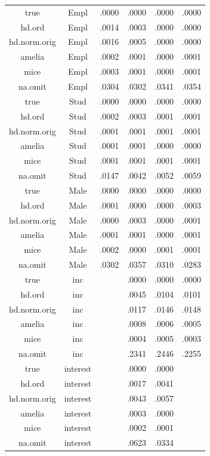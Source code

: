 \documentclass[12pt,econ]{sources/authesis}
\begin{document}
\begin{longtable}{@{\extracolsep{5pt}} cccccc}
true & Empl & .0000 & .0000 & .0000 & .0000 \\ 
hd.ord & Empl & .0014 & .0003 & .0000 & .0000 \\ 
hd.norm.orig & Empl & .0016 & .0005 & .0000 & .0000 \\ 
amelia & Empl & .0002 & .0001 & .0000 & .0001 \\ 
mice & Empl & .0003 & .0001 & .0000 & .0001 \\ 
na.omit & Empl & .0304 & .0302 & .0341 & .0354 \\ 
true & Stud & .0000 & .0000 & .0000 & .0000 \\ 
hd.ord & Stud & .0002 & .0003 & .0001 & .0001 \\ 
hd.norm.orig & Stud & .0001 & .0001 & .0001 & .0001 \\ 
amelia & Stud & .0001 & .0001 & .0000 & .0000 \\ 
mice & Stud & .0001 & .0001 & .0001 & .0001 \\ 
na.omit & Stud & .0147 & .0042 & .0052 & .0059 \\ 
true & Male & .0000 & .0000 & .0000 & .0000 \\ 
hd.ord & Male & .0001 & .0000 & .0000 & .0003 \\ 
hd.norm.orig & Male & .0000 & .0003 & .0000 & .0001 \\ 
amelia & Male & .0001 & .0001 & .0000 & .0001 \\ 
mice & Male & .0002 & .0000 & .0001 & .0001 \\ 
na.omit & Male & .0302 & .0357 & .0310 & .0283 \\ 
true & inc &  & .0000 & .0000 & .0000 \\ 
hd.ord & inc &  & .0045 & .0104 & .0101 \\ 
hd.norm.orig & inc &  & .0117 & .0146 & .0148 \\ 
amelia & inc &  & .0008 & .0006 & .0005 \\ 
mice & inc &  & .0004 & .0005 & .0003 \\ 
na.omit & inc &  & .2341 & .2446 & .2255 \\ 
true & interest &  & .0000 & .0000 &  \\ 
hd.ord & interest &  & .0017 & .0041 &  \\ 
hd.norm.orig & interest &  & .0043 & .0057 &  \\ 
amelia & interest &  & .0003 & .0000 &  \\ 
mice & interest &  & .0002 & .0001 &  \\ 
na.omit & interest &  & .0623 & .0334 &  \\ 

\end{longtable}
\end{document}
